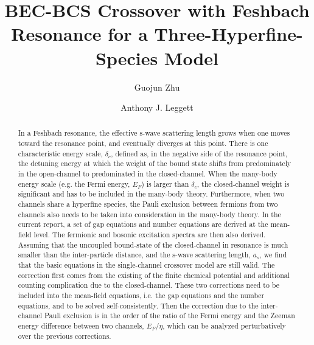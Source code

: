 \documentclass[reprint,pra]{revtex4-1}
\begin{document}
\title{BEC-BCS Crossover with Feshbach Resonance for a Three-Hyperfine-Species Model}
\author{Guojun Zhu}
\author{Anthony J. Leggett}

%
\begin{abstract}
 In a Feshbach resonance, the effective s-wave scattering length grows when one moves toward the resonance point, and eventually diverges at this point.  There is one characteristic energy scale, $\delta_c$, defined as, in the negative side of the resonance point, the detuning energy at which the weight of the bound state shifts from predominately in the open-channel to predominated in the closed-channel.  When the many-body energy scale (e.g. the Fermi energy, $E_{F}$) is larger than $\delta_c$, the closed-channel weight is significant and has to be included in the many-body theory.  Furthermore, when two channels share a hyperfine species, the Pauli exclusion between fermions from two channels also needs to be taken into consideration in the many-body theory.  
In the current report, a set of gap equations and number equations  are derived at the mean-field level.  The fermionic and bosonic excitation spectra are then also derived. Assuming that the uncoupled bound-state of the closed-channel in resonance is much smaller than the inter-particle distance, and  the s-wave scattering length, $a_s$, we find that  the basic equations in the single-channel crossover model are still valid. The correction first comes from the existing of the finite chemical potential and additional counting complication due to the closed-channel.  These two corrections need to be included into the mean-field equations, i.e. the gap equations and the number equations, and to be solved self-consistently.  Then the correction due to the inter-channel Pauli exclusion is in the  order of the ratio of the Fermi energy and the Zeeman energy difference between two channels, $E_F/\eta$, which can be analyzed perturbatively over the previous corrections.  
\end{abstract}
\maketitle


\end{document}
